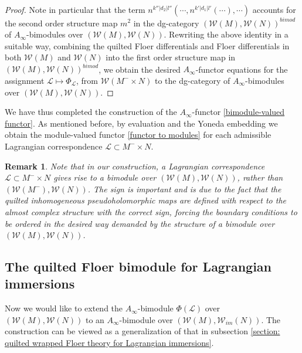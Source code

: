 \documentclass{amsart}
\newtheorem{remark}[theorem]{Remark}
\numberwithin{equation}{section}
\numberwithin{figure}{section}
\begin{document}
\begin{proof}
Note in particular that the term $n^{k''|d_{2}|l''}(\cdots, n^{k'|d_{1}|l'}(\cdots), \cdots)$ accounts for the second order structure map $m^{2}$ in the dg-category $(\mathcal{W}(M), \mathcal{W}(N))^{bimod}$ of $A_{\infty}$-bimodules over $(\mathcal{W}(M), \mathcal{W}(N))$. Rewriting the above identity in a suitable way, combining the quilted Floer differentials and Floer differentials in both $\mathcal{W}(M)$ and $\mathcal{W}(N)$ into the first order structure map in $(\mathcal{W}(M), \mathcal{W}(N))^{bimod}$, we obtain the desired $A_{\infty}$-functor equations for the assignment $\mathcal{L} \mapsto \Phi_{\mathcal{L}}$, from $\mathcal{W}(M^{-} \times N)$ to the dg-category of $A_{\infty}$-bimodules over $(\mathcal{W}(M), \mathcal{W}(N))$. \par
\end{proof}

	We have thus completed the construction of the $A_{\infty}$-functor \eqref{bimodule-valued functor}. As mentioned before, by evaluation and the Yoneda embedding we obtain the module-valued functor \eqref{functor to modules} for each admissible Lagrangian correspondence $\mathcal{L} \subset M^{-} \times N$. \par

\begin{remark}
	Note that in our construction, a Lagrangian correspondence $\mathcal{L} \subset M^{-} \times N$ gives rise to a bimodule over $(\mathcal{W}(M), \mathcal{W}(N))$, rather than $(\mathcal{W}(M^{-}), \mathcal{W}(N))$. The sign is important and is due to the fact that the quilted inhomogeneous pseudoholomorphic maps are defined with respect to the almost complex structure with the correct sign, forcing the boundary conditions to be ordered in the desired way demanded by the structure of a bimodule over $(\mathcal{W}(M), \mathcal{W}(N))$.
\end{remark}

\subsection{The quilted Floer bimodule for Lagrangian immersions}
	Now we would like to extend the $A_{\infty}$-bimodule $\Phi(\mathcal{L})$ over $(\mathcal{W}(M), \mathcal{W}(N))$ to an $A_{\infty}$-bimodule over $(\mathcal{W}(M), \mathcal{W}_{im}(N))$. The construction can be viewed as a generalization of that in subsection \ref{section: quilted wrapped Floer theory for Lagrangian immersions}. \par
\end{document}

